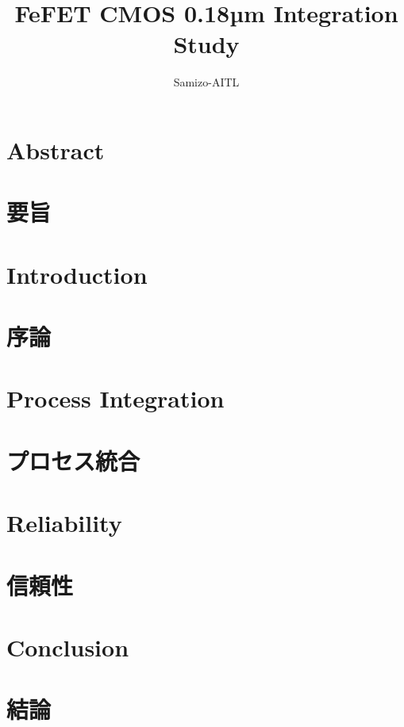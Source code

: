 \documentclass[journal]{IEEEtran}
\begin{document}
\title{FeFET CMOS 0.18µm Integration Study}
\author{Samizo-AITL}
\maketitle

\section*{Abstract}


\section*{要旨}


\section{Introduction}

\section*{序論}


\section{Process Integration}

\section*{プロセス統合}


\section{Reliability}

\section*{信頼性}


\section{Conclusion}

\section*{結論}




\end{document}
